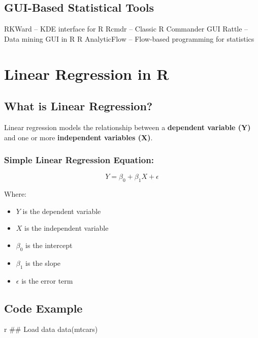 \documentclass[
  letterpaper,
  DIV=11,
  numbers=noendperiod]{scrreprt}
\providecommand{\tightlist}{%
  \setlength{\itemsep}{0pt}\setlength{\parskip}{0pt}}
\begin{document}
\subsection{GUI-Based Statistical
Tools}\label{gui-based-statistical-tools}

RKWard -- KDE interface for R Rcmdr -- Classic R Commander GUI Rattle --
Data mining GUI in R R AnalyticFlow -- Flow-based programming for
statistics

\section{Linear Regression in R}\label{linear-regression-in-r}

\subsection{What is Linear Regression?}\label{what-is-linear-regression}

Linear regression models the relationship between a \textbf{dependent
variable (Y)} and one or more \textbf{independent variables (X)}.

\subsubsection{Simple Linear Regression
Equation:}\label{simple-linear-regression-equation}

\[
Y = \beta_0 + \beta_1 X + \epsilon
\]

Where:

\begin{itemize}
\tightlist
\item
  \(Y\) is the dependent variable\\
\item
  \(X\) is the independent variable\\
\item
  \(\beta_0\) is the intercept\\
\item
  \(\beta_1\) is the slope\\
\item
  \(\epsilon\) is the error term
\end{itemize}

\subsection{Code Example}\label{code-example}

r \#\# Load data data(mtcars)
\end{document}
